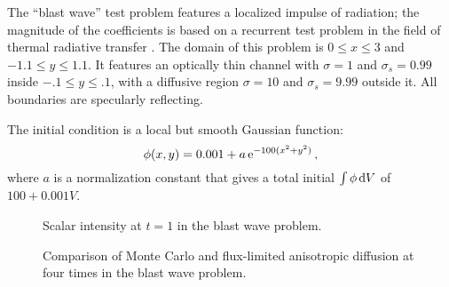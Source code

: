 The ``blast wave'' test problem features a localized impulse of radiation; the
magnitude of the coefficients is based on a recurrent test problem in the field
of thermal radiative transfer \cite{Kno1999a,Kno2001,Rau2005,Ols2007}. The
domain of this problem is $0 \le x \le 3$ and $-1.1 \le y \le 1.1$.
It features an optically thin channel with $\sigma=1$ and $\sigma_s=0.99$ inside
$-.1 \le y \le .1$, with a diffusive region $\sigma=10$ and $\sigma_s=9.99$
outside it. All boundaries are specularly reflecting.

The initial condition is a local but smooth Gaussian function:
\begin{equation*}
  \phi(x,y) = 0.001 + a \mathop{}\!\mathrm{e}^{-100 (x^2 + y^2) }\,,
\end{equation*}
where $a$ is a normalization constant that gives a total initial $\int \phi
\mathop{}\!\mathrm{d} V$ of $100 + 0.001 V$.

\begin{figure}[htb]
  \centering\small

  \caption{Scalar intensity at $t=1$ in the blast wave problem.}
  \label{fig:tdBlastwave}
\end{figure}

\begin{figure}[htb]
  \centering\small
    

  \caption{Comparison of Monte Carlo and flux-limited anisotropic diffusion at
  four times in the blast wave problem.}
  \label{fig:tdBlastwaveAll}
\end{figure}


